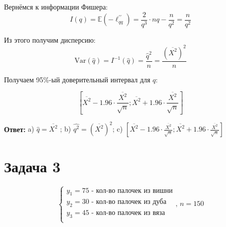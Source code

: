 \documentclass[12pt,letterpaper]{article}
\newcommand{\Var}{\mathrm{Var}}
\begin{document}
\begin{enumerate} [a)]
{        Вернёмся к информации Фишера:
        $$I(q) = \mathbb{E}(-\ell^{\prime\prime}_{qq}) = \frac{2}{q^3} \cdot nq - \frac{n}{q^2} = \frac{n}{q^2}$$
        
        Из этого получим дисперсию:
        $$\Var(\hat{q}) = I^{-1}(\hat{q}) = \frac{\hat{q}^2}{n} = \frac{(\overline{X^2})^2}{n}$$
        
        Получаем 95\%-ый доверительный интервал для $q$:
        
        $$\left[\overline{X^2} - 1.96 \cdot \frac{\overline{X^2}}{\sqrt{n}} ; \overline{X^2} + 1.96 \cdot \frac{\overline{X^2}}{\sqrt{n}}\right]$$
    }
\end{enumerate}
\textbf{Ответ:} 
{
    a) $\hat{q} = \overline{X^2}$ ; b) $\widehat{q^2} = (\overline{X^2})^2$; c) $\left[\overline{X^2} - 1.96 \cdot \frac{\overline{X^2}}{\sqrt{n}} ; \overline{X^2} + 1.96 \cdot \frac{\overline{X^2}}{\sqrt{n}}\right]$
}

\section*{Задача 3}
$$\begin{cases}
    y_1 = 75 \text{ - кол-во палочек из вишни} \\
    y_2 = 30 \text{ - кол-во палочек из дуба} \\
    y_3 = 45 \text{ - кол-во палочек из вяза} \\
\end{cases} , \,n = 150$$
\end{document}
